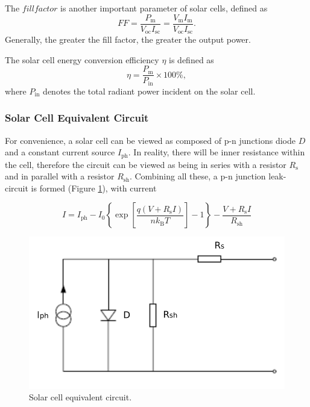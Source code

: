 \documentclass{article}
\begin{document}
The $fill factor$ is another important parameter of solar cells, defined as
\begin{equation}
    FF = \frac{P_\text{m}}{V_{\text{oc}}I_{\text{sc}}} = \frac{V_\text{m}I_{\text{m}}}{V_{\text{oc}}I_{\text{sc}}}.
    \label{eq:FF}
\end{equation}
Generally, the greater the fill factor, the greater the output power.

The solar cell energy conversion efficiency $\eta$ is defined as
\begin{equation}
    \eta = \frac{P_\text{m}}{P_{\text{in}}}\times 100\%,
    \label{eq:efficiency}
\end{equation}
where $P_{\text{in}}$ denotes the total radiant power incident on the solar cell.

\subsubsection{Solar Cell Equivalent Circuit}

For convenience, a solar cell can be viewed as composed of p-n junctions diode $D$ and a constant current source $I_{\mathrm{ph}}$. In reality, there will be inner resistance within the cell, therefore the circuit can be viewed as being in series with a resistor $R_{\mathrm{s}}$ and in parallel with a resistor $R_{\mathrm{sh}}$. Combining all these, a p-n junction leak-circuit is formed (Figure \ref{fig.circuit}), with current

\begin{equation}
I=I_{\mathrm{ph}}-I_{0}\left\{\exp \left[\frac{q\left(V+R_{\mathrm{s}} I\right)}{n k_{\mathrm{B}} T}\right]-1\right\}-\frac{V+R_{\mathrm{s}} I}{R_{\mathrm{sh}}}
\end{equation}

\begin{figure}[H]
\centering
\includegraphics[scale=0.5]{circuit}
\caption{Solar cell equivalent circuit.}\label{fig.circuit}
\end{figure}
\end{document}
